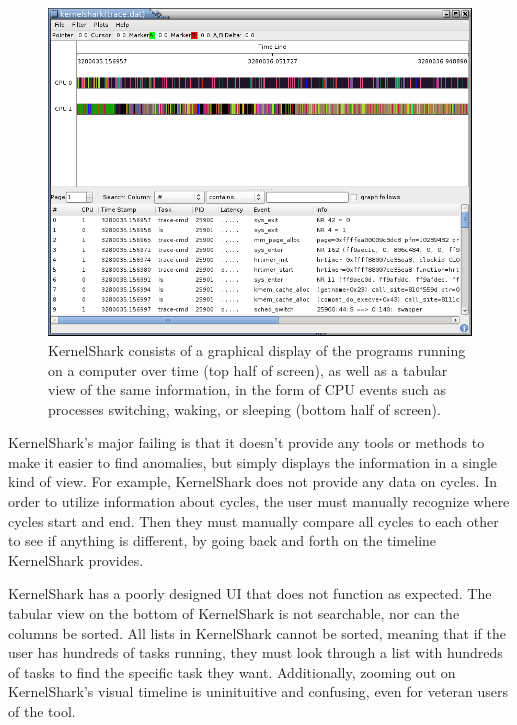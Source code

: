 \documentclass{hmcclinic}
\begin{document}
\begin{figure}[H]
  \centering
      \includegraphics[width=5in]{kshark-open.png}
  \caption{KernelShark consists of a graphical display of the programs running on a computer over time (top half of screen), as well as a tabular view of the same information, in the form of CPU events such as processes switching, waking, or sleeping (bottom half of screen).}
\end{figure}

KernelShark's major failing is that it doesn't provide any tools or methods to
make it easier to find anomalies, but simply displays the information in a
single
kind of view. For example, KernelShark does not provide any data on cycles. 
In order to utilize information about cycles, the
user must manually recognize where cycles start and end. Then they must manually
compare all cycles to each other to see if anything is different, by going back
and forth on the timeline KernelShark provides.

KernelShark has a poorly designed UI that does not function as
expected. The tabular view on the bottom of KernelShark is not searchable, nor
can the columns be sorted. All lists in KernelShark cannot be sorted, meaning
that if the user has hundreds of tasks running, they must look through a list
with hundreds of tasks to find the specific task they want. Additionally, zooming out on
KernelShark's visual timeline is uninituitive and confusing, even for veteran
users of the tool.

\end{document}
